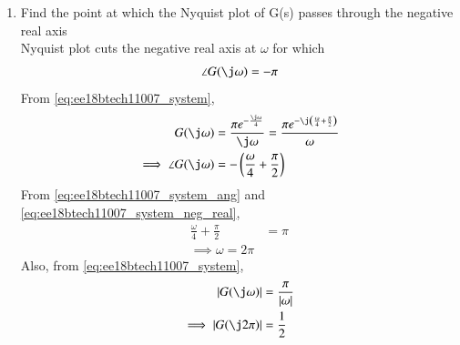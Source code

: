 \begin{enumerate}[label=\thesection.\arabic*.,ref=\thesection.\theenumi]
\begin{figure}[!h]
  \caption{}
  \label{fig:ee18btech11007}
\end{figure}
%
\item Find the point at which the Nyquist plot of G(s) passes through the negative real axis
\\
\solution  Nyquist plot cuts the negative real axis at $\omega $ for which 
\begin{align}
\angle G(\j\omega)=-\pi
\label{eq:ee18btech11007_system_neg_real}
\end{align}
From \eqref{eq:ee18btech11007_system},
\begin{align}
 G(\j\omega)&=\frac{\pi e^{-\frac{\j\omega}{4}}}{\j\omega} = \frac{\pi e^{-\j\brak{\frac{\omega}{4}+\frac{\pi}{2}}}}{\omega}
\\
\implies \angle{ G(\j\omega)} &= -\brak{\frac{\omega}{4}+\frac{\pi}{2}}
\label{eq:ee18btech11007_system_ang}
\end{align}
From \eqref{eq:ee18btech11007_system_ang} and \eqref{eq:ee18btech11007_system_neg_real}, 
\begin{align}
\frac{\omega}{4}+\frac{\pi}{2} &= \pi
\\
\implies \omega = 2\pi
\end{align}
Also, from \eqref{eq:ee18btech11007_system},
\begin{align}
\label{eq:ee18btech11007_system_mod}
\abs{ G(\j\omega)}&=\frac{\pi }{\abs{\omega}}
\\
\implies \abs{ G(\j2\pi)} &= \frac{1}{2}
\end{align}
%


\end{enumerate}
